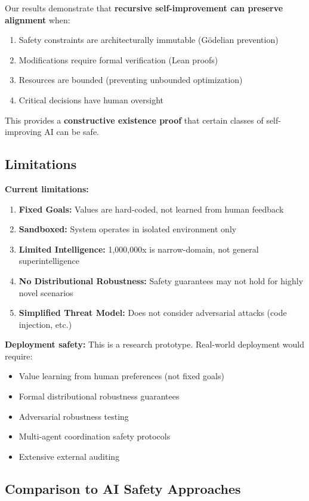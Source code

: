 \documentclass[11pt,letterpaper]{article}
\begin{document}
Our results demonstrate that \textbf{recursive self-improvement can preserve alignment} when:
\begin{enumerate}
\item Safety constraints are architecturally immutable (Gödelian prevention)
\item Modifications require formal verification (Lean proofs)
\item Resources are bounded (preventing unbounded optimization)
\item Critical decisions have human oversight
\end{enumerate}

This provides a \textbf{constructive existence proof} that certain classes of self-improving AI can be safe.

\subsection{Limitations}

\textbf{Current limitations:}

\begin{enumerate}
\item \textbf{Fixed Goals:} Values are hard-coded, not learned from human feedback
\item \textbf{Sandboxed:} System operates in isolated environment only
\item \textbf{Limited Intelligence:} 1,000,000x is narrow-domain, not general superintelligence
\item \textbf{No Distributional Robustness:} Safety guarantees may not hold for highly novel scenarios
\item \textbf{Simplified Threat Model:} Does not consider adversarial attacks (code injection, etc.)
\end{enumerate}

\textbf{Deployment safety:} This is a research prototype. Real-world deployment would require:
\begin{itemize}
\item Value learning from human preferences (not fixed goals)
\item Formal distributional robustness guarantees
\item Adversarial robustness testing
\item Multi-agent coordination safety protocols
\item Extensive external auditing
\end{itemize}

\subsection{Comparison to AI Safety Approaches}
\end{document}

